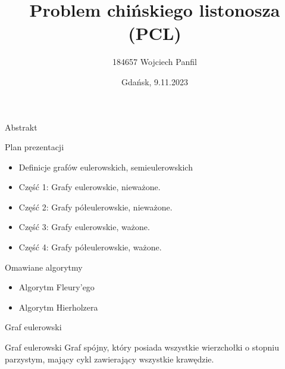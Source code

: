 \documentclass[polish,envcountsect,10pt]{beamer}
\title{Problem chińskiego listonosza (PCL)}
\author{184657 Wojciech Panfil}
\date{Gdańsk, 9.11.2023}
\begin{document}
\frame{\titlepage}

\begin{frame}{Abstrakt}
    \begin{block}{Plan prezentacji}
        \begin{itemize}
            \item Definicje grafów eulerowskich, semieulerowskich
            \item Część 1: Grafy eulerowskie, nieważone.
            \item Część 2: Grafy półeulerowskie, nieważone.
            \item Część 3: Grafy eulerowskie, ważone.
            \item Część 4: Grafy półeulerowskie, ważone.
        \end{itemize}
    \end{block}
    \begin{block}{Omawiane algorytmy}
        \begin{itemize}
            \item Algorytm Fleury'ego
            \item Algorytm Hierholzera
        \end{itemize}
    \end{block}
\end{frame}

\begin{frame}{Graf eulerowski}
    \begin{block}{Graf eulerowski}
        Graf spójny, który posiada wszystkie wierzchołki o stopniu parzystym, mający cykl zawierający wszystkie krawędzie.
    \end{block}
    \begin{center}
    \end{center}
\end{frame}
\end{document}
